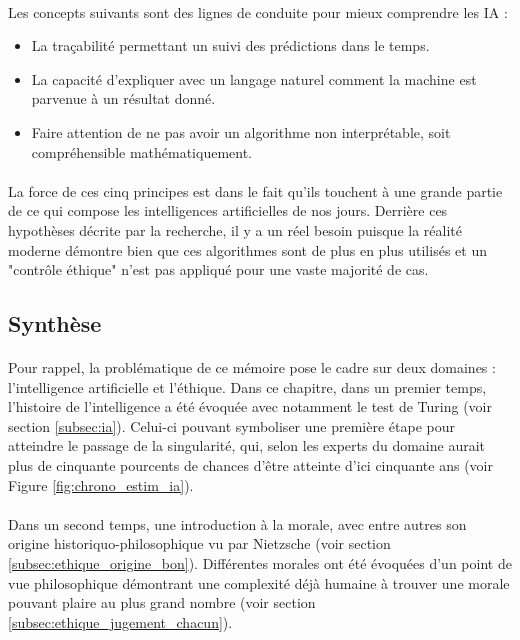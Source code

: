 \documentclass[10pt, french, a4paper]{article}
\begin{document}
\paragraph{}
Les concepts suivants sont des lignes de conduite pour mieux comprendre les IA :
\begin{itemize}
    \item La traçabilité permettant un suivi des prédictions dans le temps.
    \item La capacité d'expliquer avec un langage naturel comment la machine est parvenue à un résultat donné.
    \item Faire attention de ne pas avoir un algorithme non interprétable, soit compréhensible mathématiquement.
\end{itemize}

\paragraph{}
La force de ces cinq principes est dans le fait qu'ils touchent à une grande partie de ce qui compose les intelligences artificielles de nos jours. Derrière ces hypothèses décrite par la recherche, il y a un réel besoin puisque la réalité moderne démontre bien que ces algorithmes sont de plus en plus utilisés et un "contrôle éthique" n'est pas appliqué pour une vaste majorité de cas.

\subsection{Synthèse}

\paragraph{}
Pour rappel, la problématique de ce mémoire pose le cadre sur deux domaines : l’intelligence artificielle et l’éthique. Dans ce chapitre, dans un premier temps, l’histoire de l’intelligence a été évoquée avec notamment le test de Turing (voir section \ref{subsec:ia}). Celui-ci pouvant symboliser une première étape pour atteindre le passage de la singularité, qui, selon les experts du domaine aurait plus de cinquante pourcents de chances d’être atteinte d’ici cinquante ans (voir Figure \ref{fig:chrono_estim_ia}).

\paragraph{}
Dans un second temps, une introduction à la morale, avec entre autres son origine historiquo-philosophique vu par Nietzsche (voir section \ref{subsec:ethique_origine_bon}). Différentes morales ont été évoquées d’un point de vue philosophique démontrant une complexité déjà humaine à trouver une morale pouvant plaire au plus grand nombre (voir section \ref{subsec:ethique_jugement_chacun}).
\end{document}
